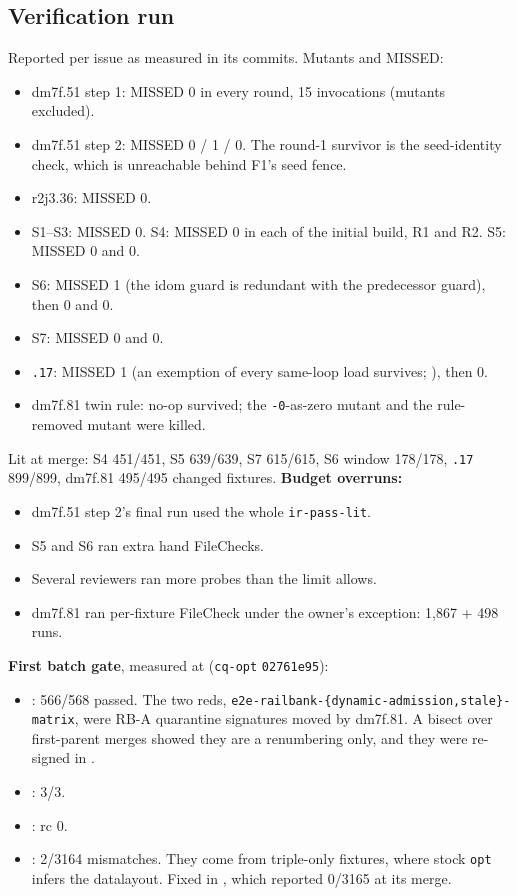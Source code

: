 \subsection*{Verification run}
Reported per issue as measured in its commits. Mutants and MISSED:
\begin{itemize}[itemsep=1pt]
\item dm7f.51 step 1: MISSED 0 in every round, 15 invocations (mutants excluded).
\item dm7f.51 step 2: MISSED 0 / 1 / 0. The round-1 survivor is the seed-identity check, which is unreachable behind F1's seed fence.
\item r2j3.36: MISSED 0.
\item S1--S3: MISSED 0. S4: MISSED 0 in each of the initial build, R1 and R2. S5: MISSED 0 and 0.
\item S6: MISSED 1 (the idom guard is redundant with the predecessor guard), then 0 and 0.
\item S7: MISSED 0 and 0.
\item \texttt{.17}: MISSED 1 (an exemption of every same-loop load survives; ), then 0.
\item dm7f.81 twin rule: no-op survived; the \texttt{-0}-as-zero mutant and the rule-removed mutant were killed.
\end{itemize}
Lit at merge: S4 451/451, S5 639/639, S7 615/615, S6 window 178/178, \texttt{.17} 899/899, dm7f.81 495/495 changed fixtures. \textbf{Budget overruns:}
\begin{itemize}[itemsep=1pt]
\item dm7f.51 step 2's final run used the whole \texttt{ir-pass-lit}.
\item S5 and S6 ran extra hand FileChecks.
\item Several reviewers ran more probes than the limit allows.
\item dm7f.81 ran per-fixture FileCheck under the owner's exception: 1,867 + 498 runs.
\end{itemize}

\textbf{First batch gate}, measured at  (\texttt{cq-opt} \texttt{02761e95}):
\begin{itemize}[itemsep=1pt]
\item {}: 566/568 passed. The two reds, \texttt{e2e-railbank-\{dynamic-admission,stale\}-matrix}, were RB-A quarantine signatures moved by dm7f.81. A bisect over first-parent merges showed they are a renumbering only, and they were re-signed in .
\item {}: 3/3.
\item {}: rc 0.
\item {}: 2/3164 mismatches. They come from triple-only fixtures, where stock \texttt{opt} infers the datalayout. Fixed in , which reported 0/3165 at its merge.
\end{itemize}


